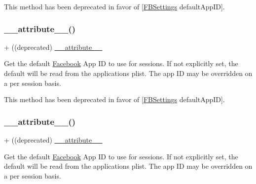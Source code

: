 This method has been deprecated in favor of \mbox{[}\hyperlink{interfaceFBSettings}{F\+B\+Settings} default\+App\+ID\mbox{]}. \mbox{\label{interfaceFBSession_aab7b90337909b905920a4067b5253c2b}} 
\subsubsection{\texorpdfstring{\+\_\+\+\_\+attribute\+\_\+\+\_\+()}{\_\_attribute\_\_()}\hspace{0.1cm}{\footnotesize\ttfamily [24/25]}}
{\footnotesize\ttfamily + ((deprecated) \hyperlink{struct____attribute____}{\+\_\+\+\_\+attribute\+\_\+\+\_\+} \begin{DoxyParamCaption}{ }\end{DoxyParamCaption}}

Get the default \hyperlink{interfaceFacebook}{Facebook} App ID to use for sessions. If not explicitly set, the default will be read from the application\textquotesingle{}s plist. The app ID may be overridden on a per session basis.

This method has been deprecated in favor of \mbox{[}\hyperlink{interfaceFBSettings}{F\+B\+Settings} default\+App\+ID\mbox{]}. \mbox{\label{interfaceFBSession_aab7b90337909b905920a4067b5253c2b}} 
\subsubsection{\texorpdfstring{\+\_\+\+\_\+attribute\+\_\+\+\_\+()}{\_\_attribute\_\_()}\hspace{0.1cm}{\footnotesize\ttfamily [25/25]}}
{\footnotesize\ttfamily + ((deprecated) \hyperlink{struct____attribute____}{\+\_\+\+\_\+attribute\+\_\+\+\_\+} \begin{DoxyParamCaption}{ }\end{DoxyParamCaption}}

Get the default \hyperlink{interfaceFacebook}{Facebook} App ID to use for sessions. If not explicitly set, the default will be read from the application\textquotesingle{}s plist. The app ID may be overridden on a per session basis.

